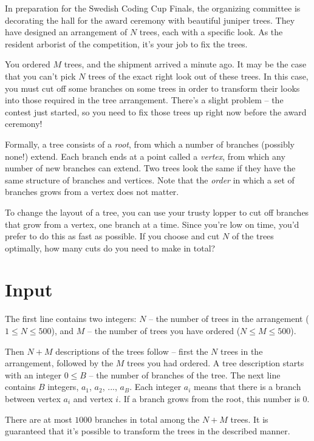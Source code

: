 In preparation for the Swedish Coding Cup Finals, the organizing committee is decorating the hall for the award ceremony with beautiful juniper trees.
They have designed an arrangement of $N$ trees, each with a specific look.
As the resident arborist of the competition, it's your job to fix the trees.

You ordered $M$ trees, and the shipment arrived a minute ago.
It may be the case that you can't pick $N$ trees of the exact right look out of these trees.
In this case, you must cut off some branches on some trees in order to transform their looks into those required in the tree arrangement.
There's a slight problem -- the contest just started, so you need to fix those trees up right now before the award ceremony!

Formally, a tree consists of a \emph{root}, from which a number of branches (possibly none!) extend.
Each branch ends at a point called a \emph{vertex}, from which any number of new branches can extend.
Two trees look the same if they have the same structure of branches and vertices.
Note that the \emph{order} in which a set of branches grows from a vertex does not matter.

To change the layout of a tree, you can use your trusty lopper to cut off branches that grow from a vertex, one branch at a time.
Since you're low on time, you'd prefer to do this as fast as possible.
If you choose and cut $N$ of the trees optimally, how many cuts do you need to make in total?

\section*{Input}
The first line contains two integers:
  $N$ -- the number of trees in the arrangement ($1 \le N \le 500$), and
  $M$ -- the number of trees you have ordered ($N \le M \le 500$).

Then $N + M$ descriptions of the trees follow -- first the $N$ trees in the arrangement, followed by the $M$ trees you had ordered.
A tree description starts with an integer $0 \le B$ -- the number of branches of the tree.
The next line contains $B$ integers, $a_1$, $a_2$, ..., $a_B$.
Each integer $a_i$ means that there is a branch between vertex $a_i$ and vertex $i$.
If a branch grows from the root, this number is $0$.

There are at most $1000$ branches in total among the $N + M$ trees.
It is guaranteed that it's possible to transform the trees in the described manner.

